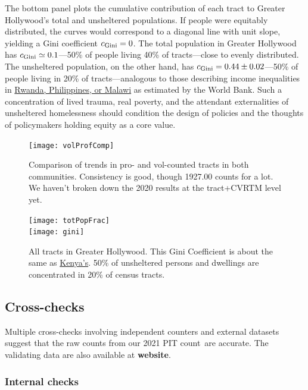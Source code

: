 \documentclass[11pt,twocolumn]{article}
\def\bfr{\bf\color{red}}
\def\Count{count}
\begin{document}
The bottom panel plots the cumulative contribution of each tract to Greater Hollywood's
total and unsheltered populations. If people were equitably distributed, the curves would 
correspond to a diagonal line with unit slope, yielding a Gini coefficient $c_{\rm Gini}=0$. 
The total population in Greater Hollywood has $c_{\rm Gini}\simeq0.1$---50\% of people 
living 40\% of tracts---close to evenly distributed. The unsheltered population, 
on the other hand, has $c_{\rm Gini}=0.44\pm0.02$---50\% of people living in 20\% of 
tracts---analogous to those describing income inequalities in 
\href{https://en.wikipedia.org/wiki/List_of_countries_by_income_equality#UN,_World_Bank_and_CIA_list_\%E2\%80\%93_income_ratios_and_Gini_indices}{Rwanda, Philippines, or Malawi} 
as estimated by the World Bank. Such a concentration of lived trauma, real poverty, and the
attendant externalities of unsheltered homelessness should condition the design of policies
and the thoughts of policymakers holding equity as a core value.

\begin{figure}[t]
	\centering
	\texttt{[image: volProfComp]}
	\caption{Comparison of trends in pro- and vol-counted tracts in both communities.
			Consistency is good, though 1927.00 counts for a lot. We haven't
			broken down the 2020 results at the tract+CVRTM level yet.}
	\label{fig:proVolComp}
\end{figure}

\begin{figure}[t]
	\centering
	\texttt{[image: totPopFrac]}\\
	\texttt{[image: gini]}
	\caption{All tracts in Greater Hollywood. This Gini Coefficient
			is about the same as 
			\href{https://en.wikipedia.org/wiki/List_of_countries_by_income_equality}{Kenya's}.
			50\% of unsheltered persons and dwellings are concentrated in 20\% of census
			tracts.}
	\label{fig:gini}
\end{figure}

\subsection{Cross-checks}
\label{sec:crossChecks}

Multiple cross-checks involving independent counters and external datasets suggest 
that the raw counts from our 2021 PIT \Count\ are accurate. The validating data are also
available at {\bfr website}.

\subsubsection{Internal checks}
\end{document}

